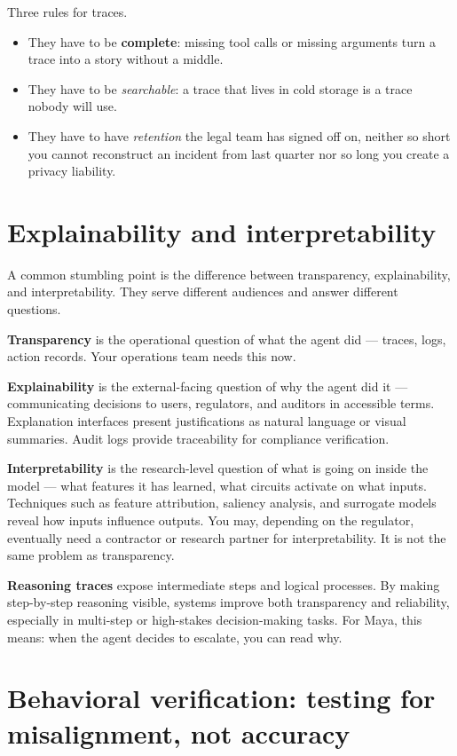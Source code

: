 Three rules for traces.

\begin{itemize}
\item They have to be \textbf{complete}: missing tool calls or missing arguments turn a trace into a story without a middle.
\item They have to be \textit{searchable}: a trace that lives in cold storage is a trace nobody will use.
\item They have to have \textit{retention} the legal team has signed off on, neither so short you cannot reconstruct an incident from last quarter nor so long you create a privacy liability.
\end{itemize}

\section{Explainability and interpretability}

A common stumbling point is the difference between transparency, explainability, and interpretability. They serve different audiences and answer different questions.

\textbf{Transparency} is the operational question of what the agent did --- traces, logs, action records. Your operations team needs this now.

\textbf{Explainability} is the external-facing question of why the agent did it --- communicating decisions to users, regulators, and auditors in accessible terms. Explanation interfaces present justifications as natural language or visual summaries. Audit logs provide traceability for compliance verification.

\textbf{Interpretability} is the research-level question of what is going on inside the model --- what features it has learned, what circuits activate on what inputs. Techniques such as feature attribution, saliency analysis, and surrogate models reveal how inputs influence outputs. You may, depending on the regulator, eventually need a contractor or research partner for interpretability. It is not the same problem as transparency.

\textbf{Reasoning traces} expose intermediate steps and logical processes. By making step-by-step reasoning visible, systems improve both transparency and reliability, especially in multi-step or high-stakes decision-making tasks. For Maya, this means: when the agent decides to escalate, you can read why.

\section{Behavioral verification: testing for misalignment, not accuracy}


